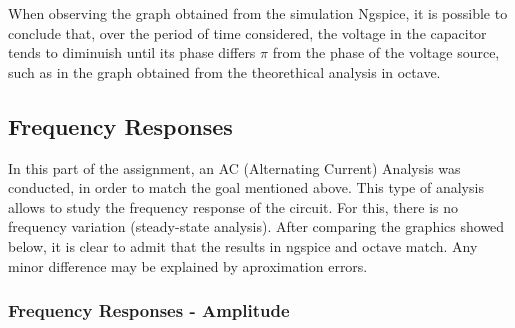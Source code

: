 When observing the graph obtained from the simulation  Ngspice, it is possible to conclude that, over the period of time considered, the voltage in the capacitor tends
to diminuish until its phase differs $\pi$ from the phase of the voltage source, such as in the graph obtained from the theorethical analysis in octave.

\subsection{Frequency Responses}

In this part of the assignment, an AC (Alternating Current) Analysis was conducted, in order to match the goal mentioned above. This type of analysis allows to study the frequency response of the circuit. For this, there is no frequency variation (steady-state analysis). After comparing the graphics showed below, it is clear to admit that the results in ngspice and octave match. Any minor difference may be explained by aproximation errors.

\subsubsection{Frequency Responses - Amplitude}

